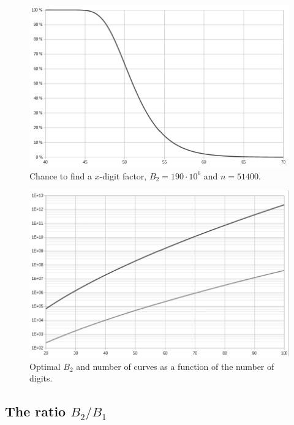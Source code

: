 \documentclass[a4paper, 11pt, pdftex]{report}
\theoremstyle{plain}
\theoremstyle{definition}
\begin{document}
\begin{figure}[!ht]
	\centering
	\includegraphics[width=15.5cm, angle=0]{img/prob_digits.pdf}
	\caption{\label{fig:p_dgt} Chance to find a $x$-digit factor, $B_2 = 190\cdot 10^6$ and $n = 51400$.}
\end{figure}

\begin{figure}[!ht]
	\vspace*{1cm}
	\centering
	\includegraphics[width=15.5cm, angle=0]{img/B2_n_digits.pdf}
	\caption{\label{fig:B2_dgt} Optimal $B_2$ and number of curves as a function of the number of digits.}
\end{figure}

\subsection{The ratio $B_2 / B_1$} \label{chap:ratio_B2_B1}
\end{document}

